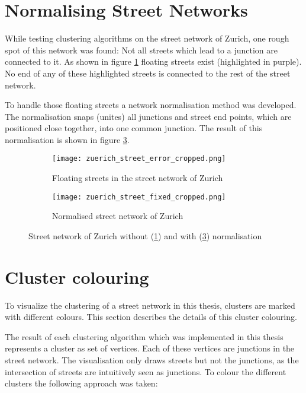 \pagebreak
\section{Normalising Street Networks}
While testing clustering algorithms on the street network of Zurich, one rough spot of this network was found: Not all streets which lead to a junction are connected to it. As shown in figure \ref{fig:zuerich_error} floating streets exist (highlighted in purple). No end of any of these highlighted streets is connected to the rest of the street network.

To handle those floating streets a network normalisation method was developed. The normalisation snaps (unites) all junctions and street end points, which are positioned close together, into one common junction. The result of this normalisation is shown in figure \ref{fig:zuerich_fixed}.

\begin{figure}
    \centering
    \begin{subfigure}[b]{0.8\textwidth}
        \begin{mdframed}[style=mdthight]
            \texttt{[image: zuerich\_street\_error\_cropped.png]}
        \end{mdframed}
        \caption{Floating streets in the street network of Zurich}
        \label{fig:zuerich_error}
    \end{subfigure}
    \par\medskip
    \begin{subfigure}[b]{0.8\textwidth}
        \begin{mdframed}[style=mdthight]
            \texttt{[image: zuerich\_street\_fixed\_cropped.png]}
        \end{mdframed}
        \caption{Normalised street network of Zurich}
        \label{fig:zuerich_fixed}
    \end{subfigure}
    \caption{Street network of Zurich without (\ref{fig:zuerich_error}) and with (\ref{fig:zuerich_fixed}) normalisation}
\end{figure}

\section{Cluster colouring}
To visualize the clustering of a street network in this thesis, clusters are marked with different colours. This section describes the details of this cluster colouring.

The result of each clustering algorithm which was implemented in this thesis represents a cluster as set of vertices. Each of these vertices are junctions in the street network. The visualisation only draws streets but not the junctions, as the intersection of streets are intuitively seen as junctions. To colour the different clusters the following approach was taken:

